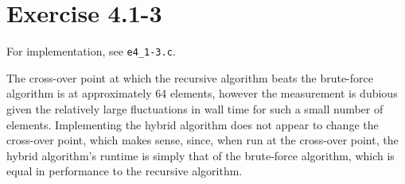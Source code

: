 \documentclass{article}
\begin{document}
\section*{Exercise 4.1-3}

For implementation, see \texttt{e4\_1-3.c}.

The cross-over point at which the recursive algorithm beats the brute-force algorithm is at approximately 64 elements, however the measurement is dubious given the relatively large fluctuations in wall time for such a small number of elements. Implementing the hybrid algorithm does not appear to change the cross-over point, which makes sense, since, when run at the cross-over point, the hybrid algorithm's runtime is simply that of the brute-force algorithm, which is equal in performance to the recursive algorithm.
\end{document}
